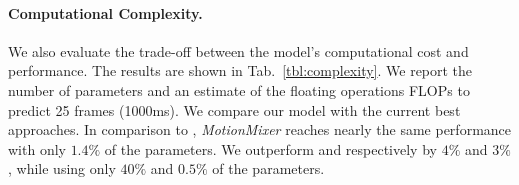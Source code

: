 \documentclass{article}
\begin{document}
\begin{table}[htp!]
\centering
{}
\caption{Influence of different parts of the \textit{STMixer} on the performance. ”SE-Block” denotes the squeeze-and-excitation blocks. The best results are shown in bold.}
\label{tab:ablation_stmixer}
\end{table}


\paragraph{Computational Complexity.} We also evaluate the trade-off between the model’s computational cost and performance. The results are shown in Tab.~\ref{tbl:complexity}. We report the number of parameters and an estimate of the floating operations FLOPs to predict 25 frames (1000ms). We compare our model with the current best approaches. In comparison to \cite{mao2021multi}, \textit{MotionMixer} reaches nearly the same performance with only $1.4\%$ of the parameters. We outperform \cite{sofianos2021space} and \cite{dang2021msr} respectively by $4\%$ and $3\%$, while using only $40\%$ and $0.5\%$ of the parameters.  
\end{document}
